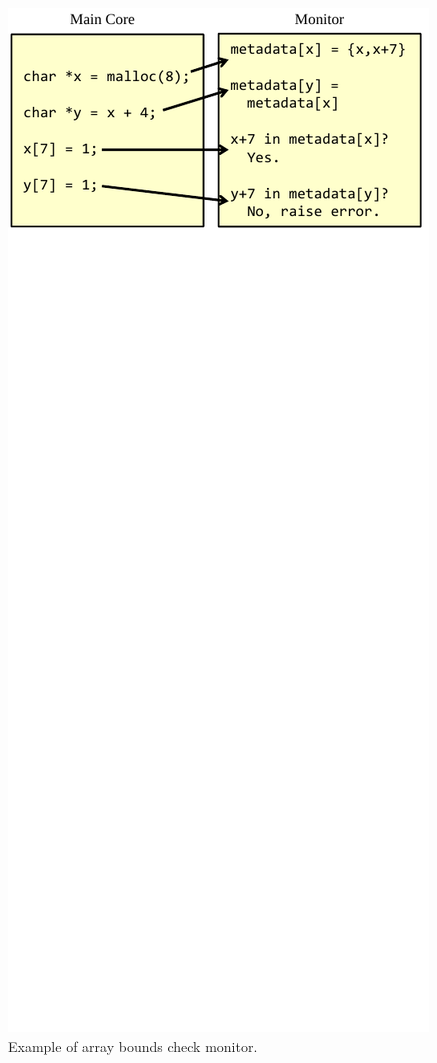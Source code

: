 \begin{figure}
\begin{center}
 \includegraphics[width=\columnwidth]{figs/example_full.pdf}
    \vspace{-0.2in}
    \caption{Example of array bounds check monitor.}
    \label{fig:monitoring.example_full}
    \vspace{-0.1in}
  \end{center}
\end{figure} 

